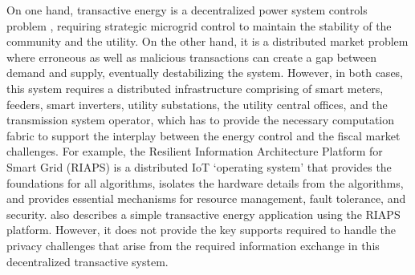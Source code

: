 On one hand, transactive energy is a decentralized power system controls problem \cite{7452738}, requiring strategic microgrid control to maintain the stability of the community and the utility. On the other hand, it is a distributed market problem where erroneous as well as malicious transactions can create a gap between demand and supply, eventually destabilizing the system. However, in both cases, this system requires a distributed  infrastructure comprising of smart meters, feeders, smart inverters, utility substations, the utility central offices, and the transmission system operator, which has to provide the necessary computation fabric to support the interplay between the energy control and the fiscal market challenges. For example, the Resilient Information Architecture Platform for Smart Grid (RIAPS) \cite{eisele2017riaps} is a distributed IoT  `operating system' that provides the foundations for all algorithms, isolates the hardware details from the algorithms, and provides essential mechanisms for resource management, fault tolerance, and security. \cite{Scott2017ICCPS} also describes a simple transactive energy application using the RIAPS platform.
However, it does not provide the key supports required to handle the privacy challenges that arise from the required information exchange in this decentralized transactive system.


